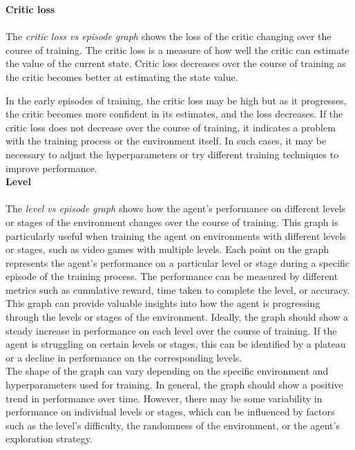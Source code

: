 \documentclass[conference]{IEEEtran}
\begin{document}
\textbf{Critic loss}\\

\\ The \textit{critic loss vs episode graph} shows the loss of the critic changing over the course of training. The critic loss is a measure of how well the critic can estimate the value of the current state. Critic loss decreases over the course of training as the critic becomes better at estimating the state value. 

In the early episodes of training, the critic loss may be high but as it progresses, the critic becomes more confident in its estimates, and the loss decreases. If the critic loss does not decrease over the course of training, it indicates a problem with the training process or the environment itself. In such cases, it may be necessary to adjust the hyperparameters or try different training techniques to improve performance.\\

\textbf{Level}\\

\\ The \textit{level vs episode graph} shows how the agent's performance on different levels or stages of the environment changes over the course of training. This graph is particularly useful when training the agent on environments with different levels or stages, such as video games with multiple levels. Each point on the graph represents the agent's performance on a particular level or stage during a specific episode of the training process. The performance can be measured by different metrics such as cumulative reward, time taken to complete the level, or accuracy.\\

This graph can provide valuable insights into how the agent is progressing through the levels or stages of the environment. Ideally, the graph should show a steady increase in performance on each level over the course of training. If the agent is struggling on certain levels or stages, this can be identified by a plateau or a decline in performance on the corresponding levels.\\

The shape of the graph can vary depending on the specific environment and hyperparameters used for training. In general, the graph should show a positive trend in performance over time. However, there may be some variability in performance on individual levels or stages, which can be influenced by factors such as the level's difficulty, the randomness of the environment, or the agent's exploration strategy.\\
\end{document}
